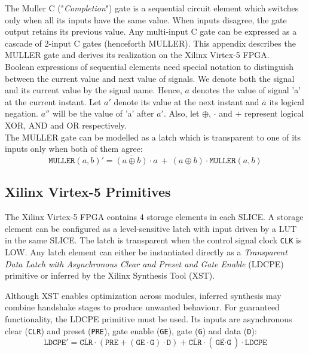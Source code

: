 The Muller C ("\emph{Completion}") gate is a sequential circuit element which switches only when all its inputs have
the same value.
When inputs disagree, the gate output retains its previous value.
Any multi-input C gate can be expressed as a cascade of 2-input C gates
(henceforth MULLER).
This appendix describes the MULLER gate and derives its realization on 
the Xilinx Virtex-5 FPGA.
\\

Boolean expressions of sequential elements need special notation to distinguish
between the current value and next value of signals. 
We denote both the signal and its current value by the signal name. 
Hence, $a$ denotes the value of signal 'a' at the current instant. 
Let $a'$ denote its value at the next instant and $\overline{a}$ its
logical negation. $a''$ will be the value of 'a' after $a'$.
Also, let $\oplus$, $\cdot$ and $+$ represent logical XOR, AND and OR respectively.
\\

The MULLER gate can be modelled as a latch which is transparent to one of its
inputs only when both of them agree:
\begin{equation} \label{eq:muller_c}
	\texttt{MULLER}(a,b)' = 
	\overline{(a \oplus b)} \cdot a\ +\ (a \oplus b) \cdot \texttt{MULLER}(a,b)
\end{equation}

\subsection{Xilinx Virtex-5 Primitives}

The Xilinx Virtex-5 FPGA contains 4 storage elements in each SLICE.
A storage element can be configured as a level-sensitive latch with input
driven by a LUT in the same SLICE. 
The latch is transparent when the control signal clock \texttt{CLK} is LOW. 
Any latch element can either be instantiated directly as a 
\textsl{Transparent Data Latch with Asynchronous Clear and Preset and Gate
Enable} (LDCPE) primitive or inferred by the Xilinx Synthesis Tool (XST).

Although XST enables optimization across modules, inferred synthesis may 
combine handshake stages to produce unwanted behaviour.
For guaranteed functionality, the LDCPE primitive must be used. 
Its inputs are asynchronous clear (\texttt{CLR}) and preset
(\texttt{PRE}), gate enable (\texttt{GE}), gate (\texttt{G}) and data
(\texttt{D}):
\begin{equation}\label{eq:virtex_latch}
	\texttt{LDCPE}' = \overline{\texttt{CLR}} \cdot 
	(\texttt{PRE} + (\texttt{GE} \cdot \texttt{G}) \cdot \texttt{D}) +
	\overline{\texttt{CLR}} \cdot 
	(\overline{\texttt{GE} \cdot \texttt{G}}) \cdot \texttt{LDCPE}
\end{equation}


